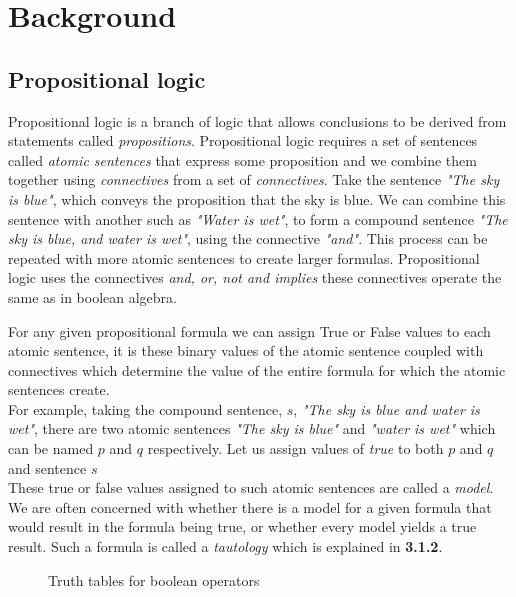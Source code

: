 \documentclass{article}%
\begin{document}
\section{Background}
\subsection{Propositional logic}
Propositional logic is a branch of logic that allows conclusions to be derived from statements called \textit{propositions}. Propositional logic requires a set of sentences called \textit{atomic sentences} that express some proposition and we combine them together using \textit{connectives} from a set of \textit{connectives}. Take the sentence \textit{"The sky is blue"}, which conveys the proposition that the sky is blue. We can combine this sentence with another such as \textit{"Water is wet"}, to form a compound sentence \textit{"The sky is blue, and water is wet"}, using the connective \textit{"and"}. This process can be repeated with more atomic sentences to create larger formulas. Propositional logic uses the connectives \textit{and, or, not and implies} these connectives operate the same as in boolean algebra.

For any given propositional formula we can assign True or False values to each atomic sentence, it is these binary values of the atomic sentence coupled with connectives which determine the value of the entire formula for which the atomic sentences create.\\ 
For example, taking the compound sentence, $s$, \textit{"The sky is blue and water is wet"}, there are two atomic sentences \textit{"The sky is blue"} and \textit{"water is wet"} which can be named $p$ and $q$ respectively. Let us assign values of \textit{true} to both $p$ and $q$ and sentence $s$  \\  
These true or false values assigned to such atomic sentences are called a \textit{model}. We are often concerned with whether there is a model for a given formula that would result in the formula being true, or whether every model yields a true result. Such a formula is called a \textit{tautology} which is explained in \textbf{3.1.2}.
\begin{figure}[h]
\hfill
{}
\hfill
{}
\hfill
{}
\hfill
{}
\hfill
\caption{Truth tables for boolean operators }
\end{figure}
\end{document}
